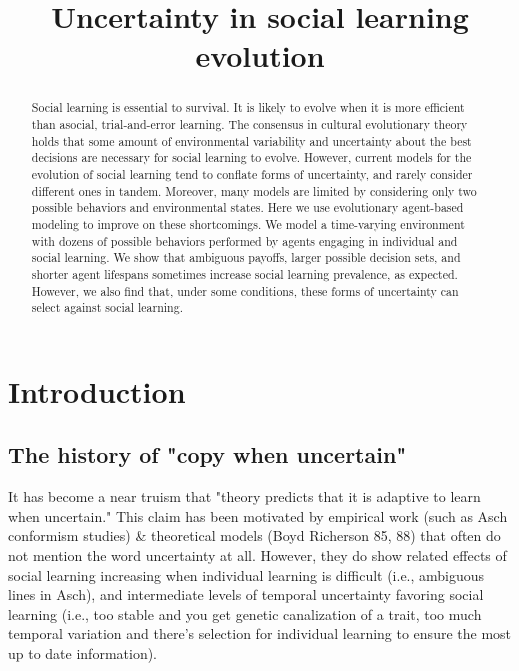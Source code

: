 \documentclass[letterpaper,11.5pt]{scrartcl}
\title{Uncertainty in social learning evolution}
\author{{}}
\begin{document}
\maketitle

\newcommand{\pisub}[1]{\pi_{\mathrm{#1}}}
\newcommand{\pilow}{\pisub{low}}
\newcommand{\pihigh}{\pisub{high}}
\newcommand{\piI}{\langle \pisub{I} \rangle}
\newcommand{\piS}{\langle \pisub{S} \rangle}

\newcommand{\meanvar}[1]{\langle #1 \rangle}
\newcommand{\meansl}{\meanvar{s}}
\newcommand{\meanpi}{\meanvar{\pi}}
\newcommand{\meansoc}{\meanvar{\pi_\mathrm{S}}}
\newcommand{\meanasoc}{\meanvar{\pi_\mathrm{A}}}
\newcommand{\meanT}{\meanvar{T}}

\begin{abstract}

Social learning is essential to survival. It is likely to evolve when it is more
efficient than asocial, trial-and-error learning. The consensus in cultural
evolutionary theory holds that some amount of environmental variability and
uncertainty about the best decisions are necessary for social learning to evolve.
However, current models for the evolution of social learning tend to conflate forms
of uncertainty, and rarely consider different ones in tandem. Moreover, many models
are limited by considering only two possible behaviors and environmental states.
Here we use evolutionary agent-based modeling to improve on these shortcomings. We
model a time-varying environment with dozens of possible behaviors performed by
agents engaging in individual and social learning. We show that ambiguous payoffs,
larger possible decision sets, and shorter agent lifespans sometimes increase social
learning prevalence, as expected. However, we also find that, under some conditions,
these forms of uncertainty can select against social learning.
\end{abstract}

\section{Introduction}

\subsection{The history of "copy when uncertain"}
It has become a near truism that "theory predicts that it is adaptive to learn when uncertain."
This claim has been motivated by empirical work (such as Asch conformism studies) \& theoretical models (Boyd Richerson 85, 88) that often do not mention the word uncertainty at all. However, they do show related effects of social learning increasing when individual learning is difficult (i.e., ambiguous lines in Asch), and intermediate levels of temporal uncertainty favoring social learning (i.e., too stable and you get genetic canalization of a trait, too much temporal variation and there's selection for individual learning to ensure the most up to date information).   
\end{document}

